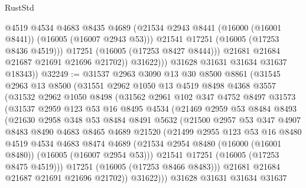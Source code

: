 \begin{lexlean}{RustStd}
\begin{coremodule}
                      @4519
                      @4534
                      @4683
                      @8435
                      @4689
                      (@21534 @2943 @8441 (@16000 (@16001 @8441)) (@16005 (@16007 @2943 @53)))
                      @21541
                      @17251
                      (@16005 (@17253 @8436 @4519)))
                    @17251
                    (@16005 (@17253 @8427 @8444)))
                  @21681
                  @21684
                  @21687
                  @21691
                  @21696
                  @21702))
              @31622)))
        @31628
        @31631
        @31634
        @31637
        @18343))
@32249 := @31537
    @2963
    @3090
    @13
    @30
    @8500
    @8861
    (@31545
      @2963
      @13
      @8500
      (@31551
        @2962
        @1050
        @13
        @4519
        @8498
        @4368
        @3557
        (@31532
          @2962
          @1050
          @8498
          (@31562
            @2961
            @102
            @347
            @4752
            @8497
            @31573
            (@31537
              @2959
              @123
              @53
              @16
              @8495
              @4534
              (@21469
                @2959
                @53
                @8484
                @8493
                (@21630
                  @2958
                  @348
                  @53
                  @8484
                  @8491
                  @5632
                  (@21500
                    @2957
                    @53
                    @347
                    @4907
                    @8483
                    @8490
                    @4683
                    @8465
                    @4689
                    @21520
                    (@21499
                      @2955
                      @123
                      @53
                      @16
                      @8480
                      @4519
                      @4534
                      @4683
                      @8474
                      @4689
                      (@21534 @2954 @8480 (@16000 (@16001 @8480)) (@16005 (@16007 @2954 @53)))
                      @21541
                      @17251
                      (@16005 (@17253 @8475 @4519)))
                    @17251
                    (@16005 (@17253 @8466 @8483)))
                  @21681
                  @21684
                  @21687
                  @21691
                  @21696
                  @21702))
              @31622)))
        @31628
        @31631
        @31634
        @31637

\end{coremodule}
\end{lexlean}
